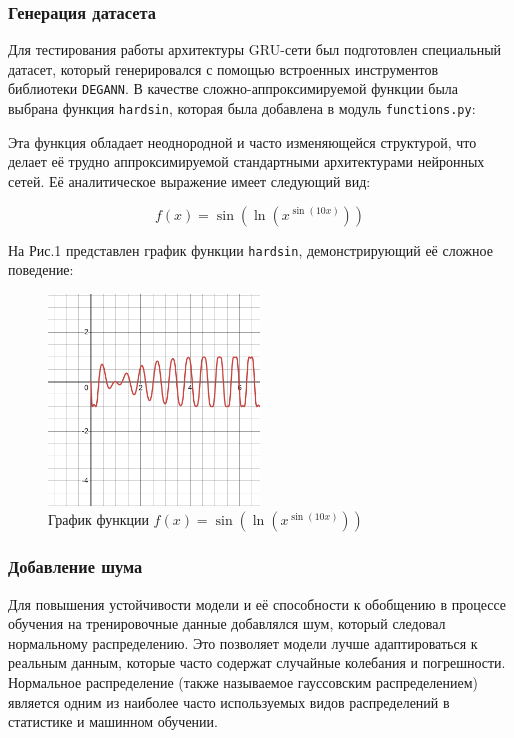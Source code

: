 \subsubsection{Генерация датасета}
Для тестирования работы архитектуры GRU-сети был подготовлен специальный датасет, который генерировался с помощью встроенных инструментов библиотеки \texttt{DEGANN}. В качестве сложно-аппроксимируемой функции была выбрана функция \texttt{hardsin}, которая была добавлена в модуль \texttt{functions.py}:

Эта функция обладает неоднородной и часто изменяющейся структурой, что делает её трудно аппроксимируемой стандартными архитектурами нейронных сетей. Её аналитическое выражение имеет следующий вид:

\[
f(x) = \sin\left(\ln(x^{\sin(10x)})\right)
\]

На Рис.1 представлен график функции \texttt{hardsin}, демонстрирующий её сложное поведение:

\begin{figure}[H]
    \centering
    \includegraphics[width=0.5\textwidth]{figures/graph_hardsin.png}
    \caption{График функции $f(x) = \sin\left(\ln(x^{\sin(10x)})\right)$}
    \label{fig:hardsin_graph}
\end{figure}

\subsubsection{Добавление шума}

Для повышения устойчивости модели и её способности к обобщению в процессе обучения на тренировочные данные добавлялся шум, который следовал нормальному распределению. Это позволяет модели лучше адаптироваться к реальным данным, которые часто содержат случайные колебания и погрешности. Нормальное распределение (также называемое гауссовским распределением) является одним из наиболее часто используемых видов распределений в статистике и машинном обучении.

